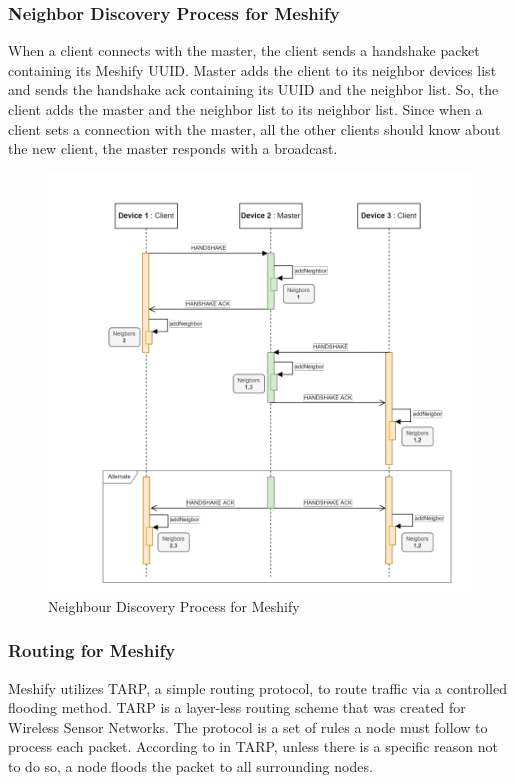 \documentclass[12pt, conference, onecolumn, a4paper]{IEEEtran}
\begin{document}
\subsubsection{Neighbor Discovery Process for Meshify}

When a client connects with the master, the client sends a handshake packet
containing its Meshify UUID. Master adds the client to its neighbor devices
list and sends the handshake ack containing its UUID and the neighbor list. So,
the client adds the master and the neighbor list to its neighbor list. Since
when a client sets a connection with the master, all the other clients should
know about the new client, the master responds with a
broadcast\cite{gunasekara2022}.

\begin{figure}[htbp]
    \centerline{\includegraphics[height=0.75\textwidth]{imgs/neighbourdis.png}}
    \caption{Neighbour Discovery Process for Meshify}
    \label{neighbourdis}
\end{figure}

\subsubsection{Routing for Meshify}

Meshify utilizes TARP, a simple routing protocol, to route traffic via a
controlled flooding method. TARP is a layer-less routing scheme that was
created for Wireless Sensor Networks. The protocol is a set of rules a node
must follow to process each packet\cite{gunasekara2022}. According to
\cite{wsn2021} in TARP, unless there is a specific reason not to do so, a node
floods the packet to all surrounding nodes.
\end{document}
